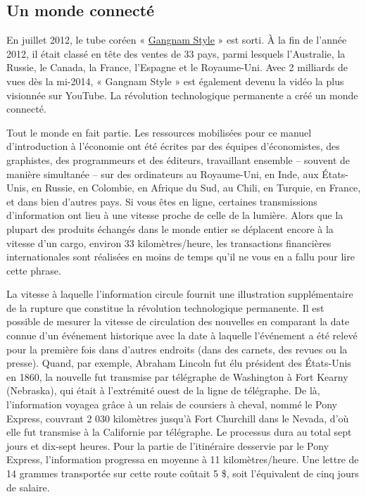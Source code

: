 \documentclass[11pt]{amsart}
\begin{document}
\hypertarget{x-un-monde-connecté}{\subsection*{Un monde connecté}}
En juillet 2012, le tube coréen « \href{https://www.youtube.com/watch?v=9bZkp7q19f0&ab_channel=officialpsy}{Gangnam Style} » est sorti. À la fin de l’année 2012, il était classé en tête des ventes de 33 pays, parmi lesquels l’Australie, la Russie, le Canada, la France, l’Espagne et le Royaume-Uni. Avec 2 milliards de vues dès la mi-2014, « Gangnam Style » est également devenu la vidéo la plus visionnée sur YouTube. La révolution technologique permanente a créé un monde connecté.


Tout le monde en fait partie. Les ressources mobilisées pour ce manuel d’introduction à l’économie ont été écrites par des équipes d’économistes, des graphistes, des programmeurs et des éditeurs, travaillant ensemble – souvent de manière simultanée – sur des ordinateurs au Royaume-Uni, en Inde, aux États-Unis, en Russie, en Colombie, en Afrique du Sud, au Chili, en Turquie, en France, et dans bien d’autres pays. Si vous êtes en ligne, certaines transmissions d’information ont lieu à une vitesse proche de celle de la lumière. Alors que la plupart des produits échangés dans le monde entier se déplacent encore à la vitesse d’un cargo, environ 33 kilomètres/heure, les transactions financières internationales sont réalisées en moins de temps qu’il ne vous en a fallu pour lire cette phrase.


La vitesse à laquelle l’information circule fournit une illustration supplé­mentaire de la rupture que constitue la révolution technologique permanente. Il est possible de mesurer la vitesse de circulation des nouvelles en comparant la date connue d’un événement historique avec la date à laquelle l’événement a été relevé pour la première fois dans d’autres endroits (dans des carnets, des revues ou la presse). Quand, par exemple, Abraham Lincoln fut élu président des États-Unis en 1860, la nouvelle fut transmise par télégraphe de Washington à Fort Kearny (Nebraska), qui était à l’extrémité ouest de la ligne de télégraphe. De là, l’information voyagea grâce à un relais de coursiers à cheval, nommé le Pony Express, couvrant 2 030 kilomètres jusqu’à Fort Churchill dans le Nevada, d’où elle fut transmise à la Californie par télégraphe. Le processus dura au total sept jours et dix-sept heures. Pour la partie de l’itiné­raire desservie par le Pony Express, l’information progressa en moyenne à 11 kilomètres/heure. Une lettre de 14 grammes transportée sur cette route coûtait 5 \$, soit l’équivalent de cinq jours de salaire.
\end{document}
